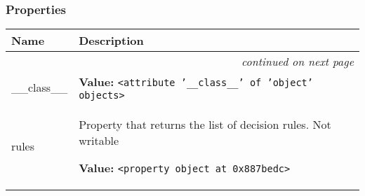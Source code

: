 
  \subsubsection{Properties}

\begin{longtable}{|p{}|p{}|l}
\cline{1-2}
\cline{1-2} \centering \textbf{Name} & \centering \textbf{Description}& \\
\cline{1-2}
\endhead\cline{1-2}\multicolumn{3}{r}{\small\textit{continued on next page}}\\\endfoot\cline{1-2}
\endlastfoot\raggedright \_\-\_\-c\-l\-a\-s\-s\-\_\-\_\- & \raggedright \textbf{Value:} 
{\tt {\textless}attribute '\_\_class\_\_' of 'object' objects{\textgreater}}&\\
\cline{1-2}
\raggedright r\-u\-l\-e\-s\- & \raggedright Property that returns the list of decision rules. Not writable

\textbf{Value:} 
{\tt {\textless}property object at 0x887bedc{\textgreater}}&\\
\cline{1-2}
\end{longtable}

